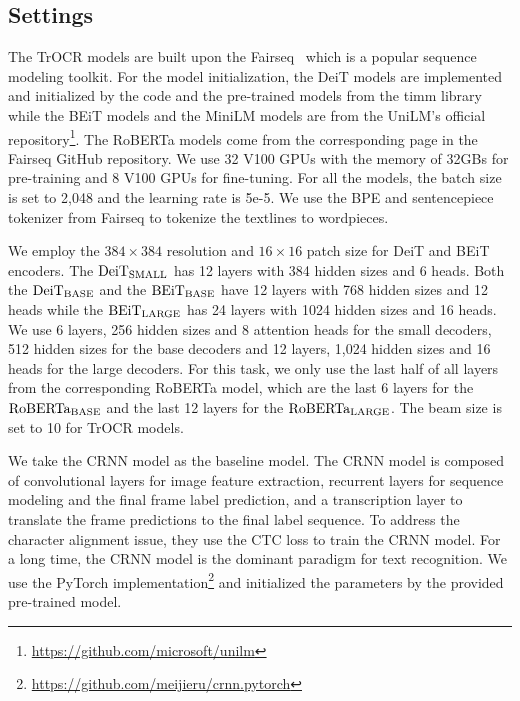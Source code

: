 \documentclass[letterpaper]{article} \usepackage{aaai23}  \usepackage{times}  \usepackage{helvet}  \usepackage{courier}  \usepackage[hyphens]{url}  \usepackage{graphicx} \urlstyle{rm} \def\UrlFont{\rm}  \usepackage{natbib}  \usepackage{caption} \frenchspacing  \setlength{\pdfpagewidth}{8.5in} \setlength{\pdfpageheight}{11in} \usepackage{algorithm}
\begin{document}
\subsection{Settings}

The TrOCR models are built upon the Fairseq~\cite{ott2019fairseq} which is a popular sequence modeling toolkit. For the model initialization, the DeiT models are implemented and initialized by the code and the pre-trained models from the timm library \cite{rw2019timm} while the BEiT models and the MiniLM models are from the UniLM’s official repository\footnote{\tiny\url{https://github.com/microsoft/unilm}}. The RoBERTa models come from the corresponding page in the Fairseq GitHub repository.
We use 32 V100 GPUs with the memory of 32GBs for pre-training and 8 V100 GPUs for fine-tuning. For all the models, the batch size is set to 2,048 and the learning rate is 5e-5. We use the BPE and sentencepiece tokenizer from Fairseq to tokenize the textlines to wordpieces.

We employ the $384 \times 384$ resolution and $16 \times 16$ patch size for DeiT and BEiT encoders. The $\textrm{DeiT}_{\rm SMALL}$ has 12 layers with 384 hidden sizes and 6 heads. Both the $\textrm{DeiT}_{\rm BASE}$ and the $\textrm{BEiT}_{\rm BASE}$ have 12 layers with 768 hidden sizes and 12 heads while the $\textrm{BEiT}_{\rm LARGE}$ has 24 layers with 1024 hidden sizes and 16 heads.
We use 6 layers, 256 hidden sizes and 8 attention heads for the small decoders, 512 hidden sizes for the base decoders and 12 layers, 1,024 hidden sizes and 16 heads for the large decoders. For this task, we only use the last half of all layers from the corresponding RoBERTa model, which are the last 6 layers for the $\textrm{RoBERTa}_{\rm BASE}$ and the last 12 layers for the $\textrm{RoBERTa}_{\rm LARGE}$. The beam size is set to 10 for TrOCR models.


We take the CRNN model \cite{shi2016end} as the baseline model. The CRNN model is composed of convolutional layers for image feature extraction, recurrent layers for sequence modeling and the final frame label prediction, and a transcription layer to translate the frame predictions to the final label sequence. To address the character alignment issue, they use the CTC loss to train the CRNN model. 
For a long time, the CRNN model is the dominant paradigm for text recognition.
We use the PyTorch implementation\footnote{\tiny\url{https://github.com/meijieru/crnn.pytorch}} and initialized the parameters by the provided pre-trained model. 
\end{document}
